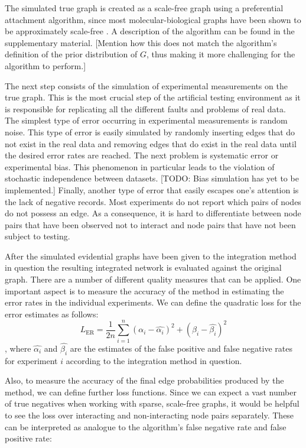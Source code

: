 \documentclass{bioinfo}
\newcommand{\note}[1]{{\color{red}[#1]}}
\begin{document}
\begin{methods}
The simulated true graph is created as a scale-free graph using a preferential attachment algorithm, since most molecular-biological graphs have been shown to be approximately scale-free \citep{jeong_lethality_2001, eisenberg_preferential_2003}. A description of the algorithm can be found in the supplementary material.
\note{Mention how this does not match the algorithm's definition of the prior distribution of $G$, thus making it more challenging for the algorithm to perform.}%

The next step consists of the simulation of experimental measurements on the true graph. This is the most crucial step of the artificial testing environment as it is responsible for replicating all the different faults and problems of real data. The simplest type of error occurring in experimental measurements is random noise. This type of error is easily simulated by randomly inserting edges that do not exist in the real data and removing edges that do exist in the real data until the desired error rates are reached. The next problem is systematic error or experimental bias. This phenomenon in particular leads to the violation of stochastic independence between datasets. 
\note{TODO: Bias simulation has yet to be implemented.}%
Finally, another type of error that easily escapes one's attention is the lack of negative records. Most experiments do not report which pairs of nodes do not possess an edge. As a consequence, it is hard to differentiate between node pairs that have been observed not to interact and node pairs that have not been subject to testing. 

After the simulated evidential graphs have been given to the integration method in question the resulting integrated network is evaluated against the original graph. There are a number of different quality measures that can be applied. One important aspect is to measure the accuracy of the method in estimating the error rates in the individual experiments. We can define the quadratic loss for the error estimates as follows:
\begin{equation}
  L_\text{ER} = \frac{1}{2n}\sum_{i=1}^n (\alpha_i - \hat{\alpha_i})^2 + (\beta_i - \hat{\beta_i})^2
\end{equation},
where $\hat{\alpha_i}$ and $\hat{\beta_i}$ are the estimates of the false positive and false negative rates for experiment $i$ according to the integration method in question.

Also, to measure the accuracy of the final edge probabilities produced by the method, we can define further loss functions. Since we can expect a vast number of true negatives when working with sparse, scale-free graphs, it would be helpful to see the loss over interacting and non-interacting node pairs separately. These can be interpreted as analogue to the algorithm's false negative rate and false positive rate:


\end{methods}
\end{document}
